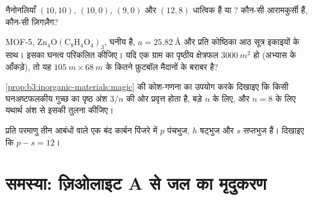\begin{exercise}[$\star\star$]\label{exo:b3:inorganic-materials:9}
नैनोनलियाँ $(10, 10)$, $(10, 0)$, $(9, 0)$ और $(12, 8)$ धात्विक हैं या ? कौन-सी
आरामकुर्सी हैं, कौन-सी ज़िगज़ैग?
\end{exercise}

\begin{exercise}[$\star\star\star$]\label{exo:b3:inorganic-materials:10}
MOF-5, $\mathrm{Zn_4O(C_8H_4O_4)_3}$, घनीय है, $a = \qty{25.82}{\angstrom}$ और प्रति कोष्ठिका आठ सूत्र इकाइयों के साथ।
इसका घनत्व परिकलित कीजिए। यदि एक ग्राम का पृष्ठीय क्षेत्रफल $\qty{3000}{m^2}$ हो (अभ्यास के
आँकड़े), तो यह $\qty{105}{m} \times \qty{68}{m}$ के कितने फ़ुटबॉल मैदानों के बराबर है?
\end{exercise}

\begin{exercise}[$\star\star\star$]\label{exo:b3:inorganic-materials:11}
\cref{prop:b3:inorganic-materials:magic} की कोश-गणना का उपयोग करके दिखाइए कि
किसी घनअष्टफलकीय गुच्छ का पृष्ठ अंश $3/n$ की ओर प्रवृत्त होता है, बड़े $n$ के लिए, और
$n = 8$ के लिए यथार्थ अंश से इसकी तुलना कीजिए।
\end{exercise}

\begin{exercise}[$\star\star\star$]\label{exo:b3:inorganic-materials:12}
प्रति परमाणु तीन आबंधों वाले एक बंद कार्बन पिंजरे में $p$ पंचभुज, $h$ षट्भुज
और $s$ सप्तभुज हैं। दिखाइए कि $p - s = 12$।
\end{exercise}

\section{समस्या: ज़िओलाइट A से जल का मृदुकरण}

